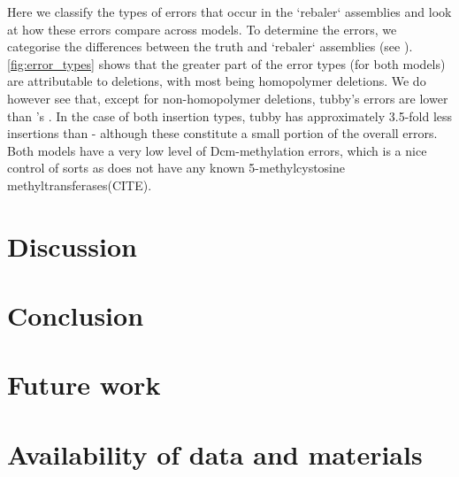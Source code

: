 Here we classify the types of errors that occur in the `rebaler` assemblies and look at how these errors compare across models. To determine the errors, we categorise the differences between the truth and `rebaler` assemblies (see ). \autoref{fig:error_types} shows that the greater part of the error types (for both models) are attributable to deletions, with most being homopolymer deletions. We do however see that, except for non-homopolymer deletions, tubby's errors are lower than \guppy{}'s . In the case of both insertion types, tubby has approximately 3.5-fold less insertions than \guppy{} - although these constitute a small portion of the overall errors. Both models have a very low level of Dcm-methylation errors, which is a nice control of sorts as \mtb{} does not have any known 5-methylcystosine methyltransferases(CITE).


\section{Discussion}

\section{Conclusion}

\section{Future work}

\section{Availability of data and materials}